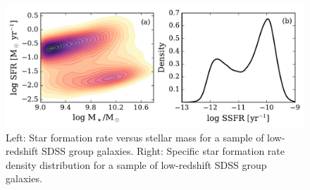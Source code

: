\begin{figure}[!ht]
  \centering
  \includegraphics[width=\textwidth]{m_sfr.pdf}
  \caption{Left: Star formation rate versus stellar mass for a sample
    of low-redshift SDSS group galaxies.  Right: Specific star
    formation rate density distribution for a sample of low-redshift
    SDSS group galaxies.}
  \label{fig:m_sfr}
\end{figure}

